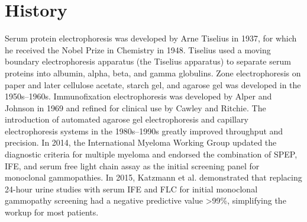 \section*{History}
Serum protein electrophoresis was developed by Arne Tiselius in 1937, for which he received the Nobel Prize in Chemistry in 1948. Tiselius used a moving boundary electrophoresis apparatus (the Tiselius apparatus) to separate serum proteins into albumin, alpha, beta, and gamma globulins. Zone electrophoresis on paper and later cellulose acetate, starch gel, and agarose gel was developed in the 1950s--1960s. Immunofixation electrophoresis was developed by Alper and Johnson in 1969 and refined for clinical use by Cawley and Ritchie. The introduction of automated agarose gel electrophoresis and capillary electrophoresis systems in the 1980s--1990s greatly improved throughput and precision. In 2014, the International Myeloma Working Group updated the diagnostic criteria for multiple myeloma and endorsed the combination of SPEP, IFE, and serum free light chain assay as the initial screening panel for monoclonal gammopathies. In 2015, Katzmann et al. demonstrated that replacing 24-hour urine studies with serum IFE and FLC for initial monoclonal gammopathy screening had a negative predictive value >99\%, simplifying the workup for most patients.

